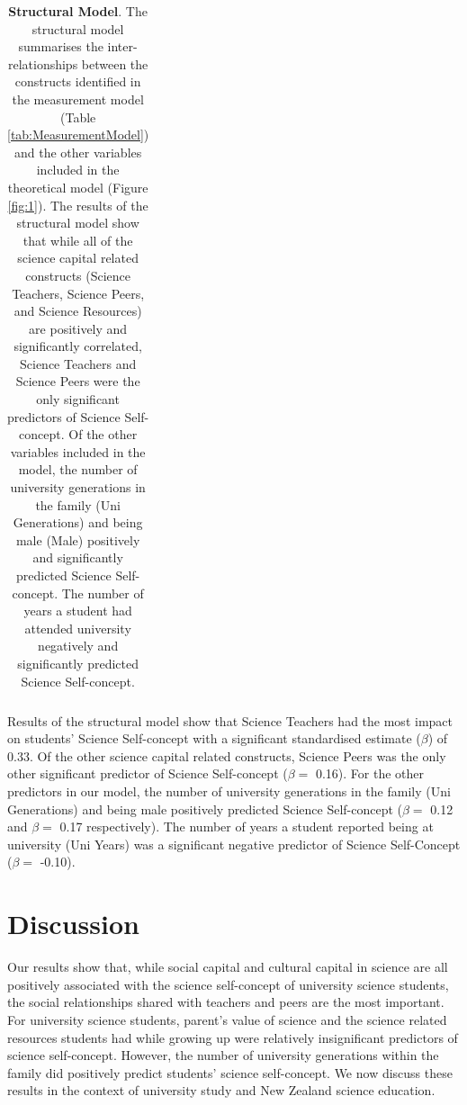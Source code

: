 \documentclass[smallextended]{svjour3}       %
\begin{document}
\begin{landscape}
\begin{table}[ht]
\begin{tabular}{llrrrrr}
   \hline
\end{tabular}
\caption{\textbf{Structural Model}. The structural model summarises the inter-relationships between the constructs identified in the measurement model (Table \ref{tab:MeasurementModel}) and the other variables included in the theoretical model (Figure  \ref{fig:1}). The results of the structural model show that while all of the science capital related constructs (Science Teachers, Science Peers, and Science Resources) are positively and significantly correlated, Science Teachers and Science Peers were the only significant predictors of Science Self-concept. Of the other variables included in the model, the number of university generations in the family (Uni Generations) and being male (Male) positively and significantly predicted Science Self-concept. The number of years a student had attended university negatively and significantly predicted Science Self-concept.} 
\label{tab:StructuralModel}
\end{table}
\end{landscape}

Results of the structural model show that Science Teachers had the most impact on students' Science Self-concept with a significant standardised estimate ($\beta$) of 0.33. Of the other science capital related constructs, Science Peers was the only other significant predictor of Science Self-concept ($\beta =$ 0.16). For the other predictors in our model, the number of university generations in the family (Uni Generations) and being male positively predicted Science Self-concept ($\beta =$ 0.12 and $\beta =$ 0.17 respectively). The number of years a student reported being at university (Uni Years) was a significant negative predictor of Science Self-Concept ($\beta =$ -0.10). 

\section*{Discussion}
\label{discussion}
Our results show that, while social capital and cultural capital in science are all positively associated with the science self-concept of university science students, the social relationships shared with teachers and peers are the most important. For university science students, parent's value of science and the science related resources students had while growing up were relatively insignificant predictors of science self-concept. However, the number of university generations within the family did positively predict students' science self-concept. We now discuss these results in the context of university study and New Zealand science education.
\end{document}

